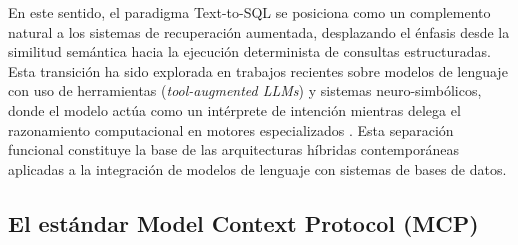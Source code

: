 En este sentido, el paradigma Text-to-SQL se posiciona como un complemento natural a los sistemas de recuperación aumentada, desplazando el énfasis desde la similitud semántica hacia la ejecución determinista de consultas estructuradas. Esta transición ha sido explorada en trabajos recientes sobre modelos de lenguaje con uso de herramientas (\textit{tool-augmented LLMs}) y sistemas neuro-simbólicos, donde el modelo actúa como un intérprete de intención mientras delega el razonamiento computacional en motores especializados \citep{yao2023react, schick2023toolformer, karpas2022mrkl}. Esta separación funcional constituye la base de las arquitecturas híbridas contemporáneas aplicadas a la integración de modelos de lenguaje con sistemas de bases de datos.

\subsection{El estándar Model Context Protocol (MCP)}


